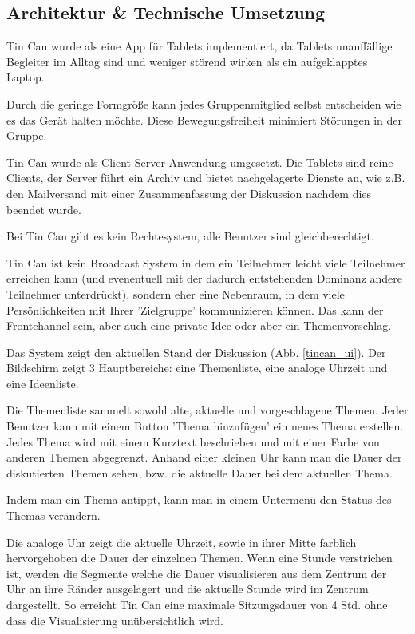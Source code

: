 \subsection{Architektur \& Technische Umsetzung}
Tin Can wurde als eine App für Tablets implementiert, da Tablets unauffällige
Begleiter im Alltag sind und weniger störend wirken als ein aufgeklapptes
Laptop.

Durch die geringe Formgröße kann jedes Gruppenmitglied selbst entscheiden wie es
das Gerät halten möchte. Diese Bewegungsfreiheit minimiert Störungen in der
Gruppe.

Tin Can wurde als Client-Server-Anwendung umgesetzt. Die Tablets sind reine
Clients, der Server führt ein Archiv und bietet nachgelagerte Dienste an, wie
z.B. den Mailversand mit einer Zusammenfassung der Diskussion nachdem dies
beendet wurde.

Bei Tin Can gibt es kein Rechtesystem, alle Benutzer sind gleichberechtigt.

Tin Can ist kein Broadcast System in dem ein Teilnehmer leicht viele Teilnehmer
erreichen kann (und evenentuell mit der dadurch entstehenden Dominanz andere
Teilnehmer unterdrückt), sondern eher eine Nebenraum, in dem viele
Persönlichkeiten mit Ihrer 'Zielgruppe' kommunizieren können. Das kann der
Frontchannel sein, aber auch eine private Idee oder aber ein Themenvorschlag.

Das System zeigt den aktuellen Stand der Diskussion (Abb. \ref{tincan_ui}). Der Bildschirm zeigt 3
Hauptbereiche: eine Themenliste, eine analoge Uhrzeit und eine Ideenliste.

Die Themenliste sammelt sowohl alte, aktuelle und vorgeschlagene Themen. Jeder
Benutzer kann mit einem Button 'Thema hinzufügen' ein neues Thema 
erstellen. Jedes Thema wird mit einem Kurztext beschrieben und mit einer Farbe 
von anderen Themen abgegrenzt. Anhand einer kleinen Uhr kann man die Dauer der 
diskutierten Themen sehen, bzw. die aktuelle Dauer bei dem aktuellen Thema.

Indem man ein Thema antippt, kann man in einem Untermenü den Status des Themas
verändern.

Die analoge Uhr zeigt die aktuelle Uhrzeit, sowie in ihrer Mitte farblich
hervorgehoben die Dauer der einzelnen Themen.
Wenn eine Stunde verstrichen ist, werden die Segmente welche die Dauer
visualisieren aus dem Zentrum der Uhr an ihre Ränder ausgelagert und die
aktuelle Stunde wird im Zentrum dargestellt. So erreicht Tin Can eine maximale
Sitzungsdauer von 4 Std. ohne dass die Visualisierung unübersichtlich wird.

